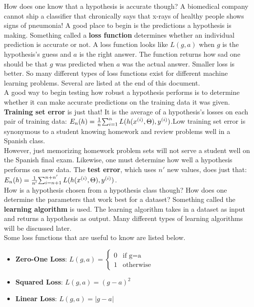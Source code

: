 \documentclass{article}
\begin{document}
How does one know that a hypothesis is accurate though? A biomedical company cannot ship a classifier that chronically says that x-rays of healthy people shows signs of pneumonia! A good place to begin is the predictions a hypothesis is making. Something called a \textbf{loss function} determines whether an individual prediction is accurate or not. A loss function looks like $L(g,a)$ when $g$ is the hypothesis's guess and $a$ is the right answer. The function returns how sad one should be that $g$ was predicted when $a$ was the actual answer. Smaller loss is better. So many different types of loss functions exist for different machine learning problems. Several are listed at the end of this document.\\

A good way to begin testing how robust a hypothesis performs is to determine whether it can make accurate predictions on the training data it was given. \textbf{Training set error} is just that! It is the average of a hypothesis's losses on each pair of training data: $E_n(h)={1\over n}{\sum^{n}_{i=1}L(h(x^{(i)},\Theta),y^{(i)})}$.Low training set error is synonymous to a student knowing homework and review problems well in a Spanish class. \\

However, just memorizing homework problem sets will not serve a student well on the Spanish final exam. Likewise, one must determine how well a hypothesis performs on new data. The \textbf{test error}, which uses $n'$ new values, does just that: $E_n(h)={1\over{n'}}{\sum_{i=n+1}^{n+n'}{L(h(x^{(i)},\Theta),y^{(i)})}}$. \\

How is a hypothesis chosen from a hypothesis class though? How does one determine the parameters that work best for a dataset? Something called the \textbf{learning algorithm} is used. The learning algorithm takes in a dataset as input and returns a hypothesis as output. Many different types of learning algorithms will be discussed later.  \\

Some loss functions that are useful to know are listed below. 
\begin{itemize}
    \item \textbf{Zero-One Loss}: $L(g,a)=\begin{cases} 
      0 &  \text{if g=a}\\
      1 &  \text{otherwise}
   \end{cases}
$
    \item \textbf{Squared Loss}: $L(g,a)=(g-a)^2$
    \item \textbf{Linear Loss}: $L(g,a)=|g-a|$
\end{itemize}
\end{document}
